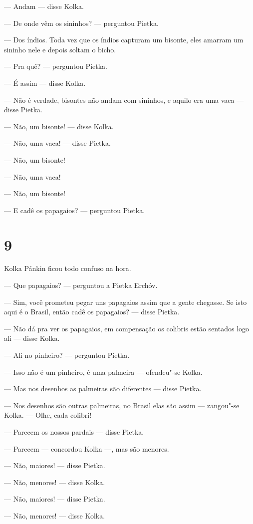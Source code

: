 --- Andam --- disse Kolka.

--- De onde vêm os sininhos? --- perguntou Pietka.

--- Dos índios. Toda vez que os índios capturam um bisonte, eles amarram
um sininho nele e depois soltam o bicho.

--- Pra quê? --- perguntou Pietka.

--- É assim --- disse Kolka.

--- Não é verdade, bisontes não andam com sininhos, e aquilo era uma
vaca --- disse Pietka.

--- Não, um bisonte! --- disse Kolka.

--- Não, uma vaca! --- disse Pietka.

--- Não, um bisonte!

--- Não, uma vaca!

--- Não, um bisonte!

--- E cadê os papagaios? --- perguntou Pietka.

\section{9}

Kolka Pánkin ficou todo confuso na hora.

--- Que papagaios? --- perguntou a Pietka Erchóv.

--- Sim, você prometeu pegar uns papagaios assim que a gente chegasse.
Se isto aqui é o Brasil, então cadê os papagaios? --- disse Pietka.

--- Não dá pra ver os papagaios, em compensação os colibris estão
sentados logo ali --- disse Kolka.

--- Ali no pinheiro? --- perguntou Pietka.

--- Isso não é um pinheiro, é uma palmeira --- ofendeu"-se Kolka.

--- Mas nos desenhos as palmeiras são diferentes --- disse Pietka.

--- Nos desenhos são outras palmeiras, no Brasil elas são assim ---
zangou"-se Kolka. --- Olhe, cada colibri!

--- Parecem os nossos pardais --- disse Pietka.

--- Parecem --- concordou Kolka ---, mas são menores.

--- Não, maiores! --- disse Pietka.

--- Não, menores! --- disse Kolka.

--- Não, maiores! --- disse Pietka.

--- Não, menores! --- disse Kolka.

